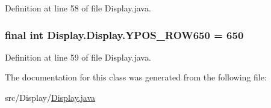 Definition at line 58 of file Display.\+java.

\hypertarget{class_display_1_1_display_a60296fc1277e58422d02f8f462ad95c5}{}
\subsubsection[{Y\+P\+O\+S\+\_\+\+R\+O\+W650}]{\setlength{\rightskip}{0pt plus 5cm}final int Display.\+Display.\+Y\+P\+O\+S\+\_\+\+R\+O\+W650 = 650\hspace{0.3cm}{\ttfamily [static]}}\label{class_display_1_1_display_a60296fc1277e58422d02f8f462ad95c5}


Definition at line 59 of file Display.\+java.



The documentation for this class was generated from the following file\+:\begin{DoxyCompactItemize}
\item 
src/\+Display/\hyperlink{_display_8java}{Display.\+java}\end{DoxyCompactItemize}
